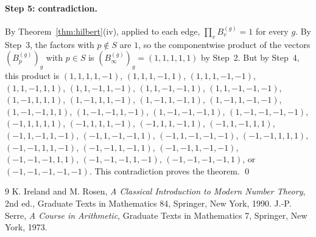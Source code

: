 \documentclass[11pt]{article}
\begin{document}
\paragraph{Step 5: contradiction.} By Theorem~\ref{thm:hilbert}(iv), applied to each edge, $\prod_vB^{(g)}_v=1$ for every $g$. By Step~3, the factors with $p\notin S$ are $1$, so the componentwise product of the vectors $(B^{(g)}_p)_g$ with $p\in S$ is $(B^{(g)}_\infty)_g=(1,1,1,1,1)$ by Step~2. But by Step~4, this product is $(1,1,1,1,-1)$, $(1,1,1,-1,1)$, $(1,1,1,-1,-1)$, $(1,1,-1,1,1)$, $(1,1,-1,1,-1)$, $(1,1,-1,-1,1)$, $(1,1,-1,-1,-1)$, $(1,-1,1,1,1)$, $(1,-1,1,1,-1)$, $(1,-1,1,-1,1)$, $(1,-1,1,-1,-1)$, $(1,-1,-1,1,1)$, $(1,-1,-1,1,-1)$, $(1,-1,-1,-1,1)$, $(1,-1,-1,-1,-1)$, $(-1,1,1,1,1)$, $(-1,1,1,1,-1)$, $(-1,1,1,-1,1)$, $(-1,1,-1,1,1)$, $(-1,1,-1,1,-1)$, $(-1,1,-1,-1,1)$, $(-1,1,-1,-1,-1)$, $(-1,-1,1,1,1)$, $(-1,-1,1,1,-1)$, $(-1,-1,1,-1,1)$, $(-1,-1,1,-1,-1)$, $(-1,-1,-1,1,1)$, $(-1,-1,-1,1,-1)$, $(-1,-1,-1,-1,1)$, or $(-1,-1,-1,-1,-1)$. This contradiction proves the theorem.
\qed

\begin{thebibliography}{9}
 K. Ireland and M. Rosen, \emph{A Classical Introduction to Modern Number Theory}, 2nd ed., Graduate Texts in Mathematics 84, Springer, New York, 1990.
 J.-P. Serre, \emph{A Course in Arithmetic}, Graduate Texts in Mathematics 7, Springer, New York, 1973.
\end{thebibliography}
\end{document}

